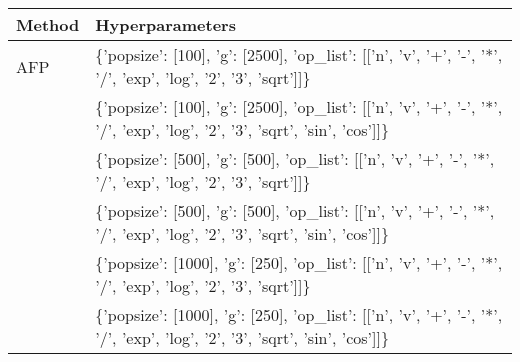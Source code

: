 \begin{tabular}{l p{37em}}
\toprule
       Method &                                                                                                                                                                                                                                                                                                  Hyperparameters \\
\midrule
          AFP &                                                                                                                                                                                                     \{'popsize': [100], 'g': [2500], 'op\_list': [['n', 'v', '+', '-', '*', '/', 'exp', 'log', '2', '3', 'sqrt']]\} \\
              &                                                                                                                                                                                       \{'popsize': [100], 'g': [2500], 'op\_list': [['n', 'v', '+', '-', '*', '/', 'exp', 'log', '2', '3', 'sqrt', 'sin', 'cos']]\} \\
              &                                                                                                                                                                                                      \{'popsize': [500], 'g': [500], 'op\_list': [['n', 'v', '+', '-', '*', '/', 'exp', 'log', '2', '3', 'sqrt']]\} \\
              &                                                                                                                                                                                        \{'popsize': [500], 'g': [500], 'op\_list': [['n', 'v', '+', '-', '*', '/', 'exp', 'log', '2', '3', 'sqrt', 'sin', 'cos']]\} \\
              &                                                                                                                                                                                                     \{'popsize': [1000], 'g': [250], 'op\_list': [['n', 'v', '+', '-', '*', '/', 'exp', 'log', '2', '3', 'sqrt']]\} \\
              &                                                                                                                                                                                       \{'popsize': [1000], 'g': [250], 'op\_list': [['n', 'v', '+', '-', '*', '/', 'exp', 'log', '2', '3', 'sqrt', 'sin', 'cos']]\} \\

\end{tabular}
